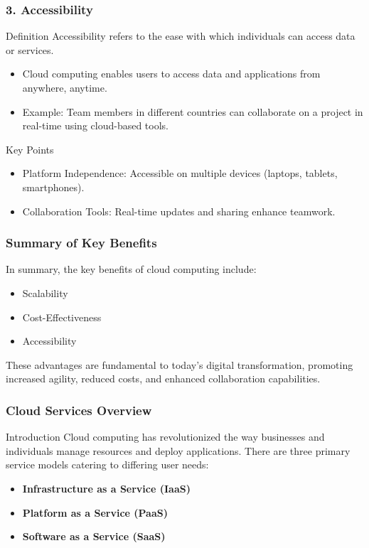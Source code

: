 \documentclass[aspectratio=169]{beamer}
\begin{document}
\begin{frame}[fragile]
    \frametitle{3. Accessibility}
    \begin{block}{Definition}
        Accessibility refers to the ease with which individuals can access data or services.
    \end{block}
    
    \begin{itemize}
        \item Cloud computing enables users to access data and applications from anywhere, anytime.
        \item Example: Team members in different countries can collaborate on a project in real-time using cloud-based tools.
    \end{itemize}

    \begin{block}{Key Points}
        \begin{itemize}
            \item Platform Independence: Accessible on multiple devices (laptops, tablets, smartphones).
            \item Collaboration Tools: Real-time updates and sharing enhance teamwork.
        \end{itemize}
    \end{block}
\end{frame}

\begin{frame}[fragile]
    \frametitle{Summary of Key Benefits}
    In summary, the key benefits of cloud computing include:
    \begin{itemize}
        \item Scalability
        \item Cost-Effectiveness
        \item Accessibility
    \end{itemize}
    These advantages are fundamental to today's digital transformation, promoting increased agility, reduced costs, and enhanced collaboration capabilities.
\end{frame}

\begin{frame}[fragile]
    \frametitle{Cloud Services Overview}
    \begin{block}{Introduction}
        Cloud computing has revolutionized the way businesses and individuals manage resources and deploy applications. There are three primary service models catering to differing user needs:
    \end{block}
    \begin{itemize}
        \item \textbf{Infrastructure as a Service (IaaS)}
        \item \textbf{Platform as a Service (PaaS)}
        \item \textbf{Software as a Service (SaaS)}
    \end{itemize}
\end{frame}
\end{document}
